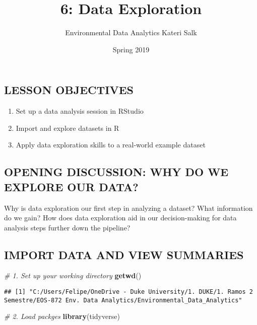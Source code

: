 \documentclass[]{article}
\title{6: Data Exploration}
\author{Environmental Data Analytics \textbar{} Kateri Salk}
\date{Spring 2019}
\newenvironment{Shaded}{\begin{snugshade}}{\end{snugshade}}
\newcommand{\KeywordTok}[1]{\textcolor[rgb]{0.13,0.29,0.53}{\textbf{#1}}}
\newcommand{\CommentTok}[1]{\textcolor[rgb]{0.56,0.35,0.01}{\textit{#1}}}
\newcommand{\NormalTok}[1]{#1}
\providecommand{\tightlist}{%
  \setlength{\itemsep}{0pt}\setlength{\parskip}{0pt}}
\begin{document}
\maketitle

\subsection{LESSON OBJECTIVES}\label{lesson-objectives}

\begin{enumerate}
\def\labelenumi{\arabic{enumi}.}
\tightlist
\item
  Set up a data analysis session in RStudio
\item
  Import and explore datasets in R
\item
  Apply data exploration skills to a real-world example dataset
\end{enumerate}

\subsection{OPENING DISCUSSION: WHY DO WE EXPLORE OUR
DATA?}\label{opening-discussion-why-do-we-explore-our-data}

Why is data exploration our first step in analyzing a dataset? What
information do we gain? How does data exploration aid in our
decision-making for data analysis steps further down the pipeline?

\subsection{IMPORT DATA AND VIEW
SUMMARIES}\label{import-data-and-view-summaries}

\begin{Shaded}
\begin{Highlighting}[]
\CommentTok{# 1. Set up your working directory}
\KeywordTok{getwd}\NormalTok{()}
\end{Highlighting}
\end{Shaded}

\begin{verbatim}
## [1] "C:/Users/Felipe/OneDrive - Duke University/1. DUKE/1. Ramos 2 Semestre/EOS-872 Env. Data Analytics/Environmental_Data_Analytics"
\end{verbatim}

\begin{Shaded}
\begin{Highlighting}[]
\CommentTok{# 2. Load packges}
\KeywordTok{library}\NormalTok{(tidyverse)}
\end{Highlighting}
\end{Shaded}
\end{document}
